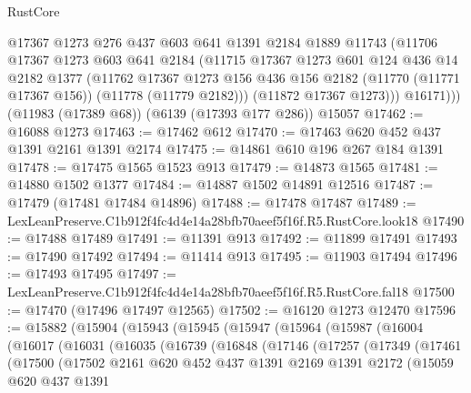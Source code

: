 \begin{lexlean}{RustCore}
\begin{coremodule}
          @17367
          @1273
          @276
          @437
          @603
          @641
          @1391
          @2184
          @1889
          @11743
          (@11706
            @17367
            @1273
            @603
            @641
            @2184
            (@11715
              @17367
              @1273
              @601
              @124
              @436
              @14
              @2182
              @1377
              (@11762
                @17367
                @1273
                @156
                @436
                @156
                @2182
                (@11770 (@11771 @17367 @156))
                (@11778 (@11779 @2182)))
              (@11872 @17367 @1273)))
          @16171)))
    (@11983 (@17389 @68))
    (@6139 (@17393 @177 @286))
    @15057
@17462 := @16088 @1273
@17463 := @17462 @612
@17470 := @17463 @620 @452 @437 @1391 @2161 @1391 @2174
@17475 := @14861 @610 @196 @267 @184 @1391
@17478 := @17475 @1565 @1523 @913
@17479 := @14873 @1565
@17481 := @14880 @1502 @1377
@17484 := @14887 @1502 @14891 @12516
@17487 := @17479 (@17481 @17484 @14896)
@17488 := @17478 @17487
@17489 := LexLeanPreserve.C1b912f4fc4d4e14a28bfb70aeef5f16f.R5.RustCore.look18
@17490 := @17488 @17489
@17491 := @11391 @913
@17492 := @11899 @17491
@17493 := @17490 @17492
@17494 := @11414 @913
@17495 := @11903 @17494
@17496 := @17493 @17495
@17497 := LexLeanPreserve.C1b912f4fc4d4e14a28bfb70aeef5f16f.R5.RustCore.fal18
@17500 := @17470 (@17496 @17497 @12565)
@17502 := @16120 @1273 @12470
@17596 := @15882
    (@15904
      (@15943
        (@15945
          (@15947
            (@15964
              (@15987
                (@16004
                  (@16017
                    (@16031
                      (@16035
                        (@16739
                          (@16848
                            (@17146
                              (@17257
                                (@17349
                                  (@17461
                                    (@17500
                                      (@17502
                                        @2161
                                        @620
                                        @452
                                        @437
                                        @1391
                                        @2169
                                        @1391
                                        @2172
                                        (@15059
                                          @620
                                          @437
                                          @1391

\end{coremodule}
\end{lexlean}
